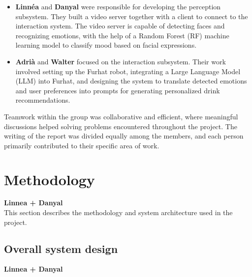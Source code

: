 \documentclass[conference]{IEEEtran}
\begin{document}
\begin{itemize}
    \item \textbf{Linnéa} and \textbf{Danyal} were responsible for developing the perception subsystem. They built a video server together with a client to connect to the interaction system. The video server is capable of detecting faces and recognizing emotions, with the help of a Random Forest (RF) machine learning model to classify mood based on facial expressions.
    
    
    \item \textbf{Adrià} and \textbf{Walter} focused on the interaction subsystem. Their work involved setting up the Furhat robot, integrating a Large Language Model (LLM) into Furhat, and designing the system to translate detected emotions and user preferences into prompts for generating personalized drink recommendations.

\end{itemize}

Teamwork within the group was collaborative and efficient, where meaningful discussions helped solving problems encountered throughout the project. The writing of the report was divided equally among the members, and each person primarily contributed to their specific area of work.
\\
\section{Methodology}
\textbf{Linnea + Danyal}
\\
This section describes the methodology and system architecture used in the project.

\subsection{Overall system design}\label{sec:overallsysdesg}
\textbf{Linnea + Danyal}
\end{document}
